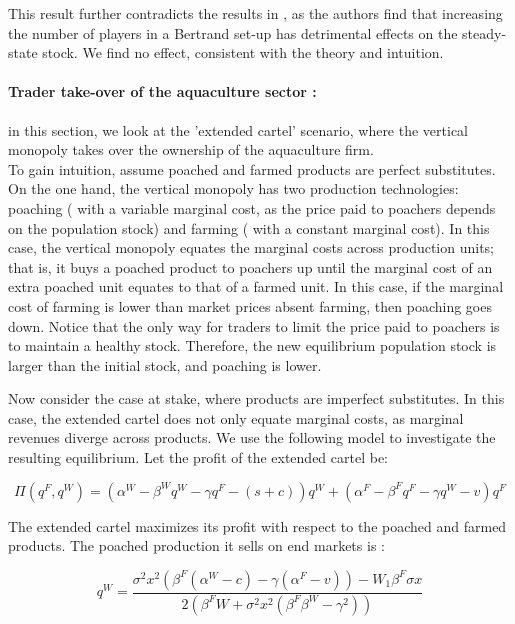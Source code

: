 This result further contradicts the results in \cite{damania_economics_2007}, as the authors find that increasing the number of players in a Bertrand set-up has detrimental effects on the steady-state stock. We find no effect, consistent with the theory and intuition. 

\paragraph{Trader take-over of the aquaculture sector : }
%
in this section, we look at the 'extended cartel' scenario, where the vertical monopoly takes over the ownership of the aquaculture firm. \\
To gain intuition, assume poached and farmed products are perfect substitutes. On the one hand, the vertical monopoly has two production technologies:  poaching ( with a variable marginal cost, as the price paid to poachers depends on the population stock) and farming ( with a constant marginal cost). In this case, the vertical monopoly equates the marginal costs across production units; that is, it buys a poached product to poachers up until the marginal cost of an extra poached unit equates to that of a farmed unit. In this case, if the marginal cost of farming is lower than market prices absent farming, then poaching goes down. Notice that the only way for traders to limit the price paid to poachers is to maintain a healthy stock. Therefore, the new equilibrium population stock is larger than the initial stock, and poaching is lower.

Now consider the case at stake, where products are imperfect substitutes. In this case, the extended cartel does not only equate marginal costs, as marginal revenues diverge across products. We use the following model to investigate the resulting equilibrium. Let the profit of the extended cartel be:

\begin{equation}
\Pi(q^F, q^W) = (\alpha^W - \beta^W q^W - \gamma q^F - (s+c))q^W + (\alpha^F - \beta^F q^F - \gamma q^W - v)q^F
\end{equation}

The extended cartel maximizes its profit with respect to the poached and farmed products. The poached production it sells on end markets is : 

\begin{equation}
q^W = \frac{\sigma^2 x^2 (\beta^F(\alpha^W -c) - \gamma (\alpha^F - v)) - W_1 \beta^F \sigma x }{2(\beta^F W + \sigma^2 x^2 (\beta^F \beta^W - \gamma^2)) }
\end{equation}


